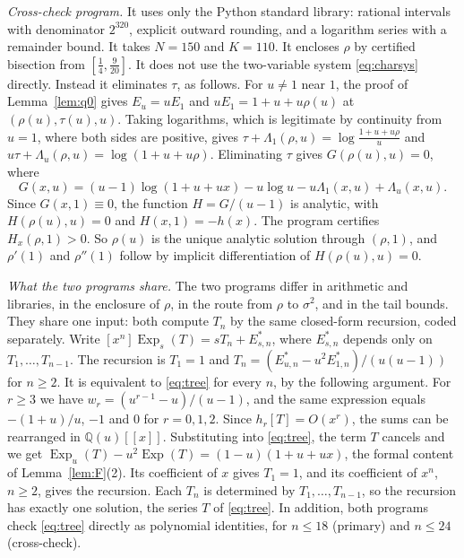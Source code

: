 \documentclass[11pt]{amsart}
\theoremstyle{definition}
\theoremstyle{remark}
\numberwithin{equation}{section}
\DeclareMathOperator{\Exp}{Exp}
\newcommand{\QQ}{\mathbb{Q}}
\begin{document}
\emph{Cross-check program.} It uses only the Python standard library: rational intervals with denominator \(2^{320}\), explicit outward rounding, and a logarithm series with a remainder bound. It takes \(N=150\) and \(K=110\). It encloses \(\rho\) by certified bisection from \([\frac14,\frac9{20}]\). It does not use the two-variable system \eqref{eq:charsys} directly. Instead it eliminates \(\tau\), as follows. For \(u\ne1\) near \(1\), the proof of Lemma~\ref{lem:q0} gives \(E_u=uE_1\) and \(uE_1=1+u+u\rho(u)\) at \((\rho(u),\tau(u),u)\). Taking logarithms, which is legitimate by continuity from \(u=1\), where both sides are positive, gives \(\tau+\Lambda_1(\rho,u)=\log\frac{1+u+u\rho}{u}\) and \(u\tau+\Lambda_u(\rho,u)=\log(1+u+u\rho)\). Eliminating \(\tau\) gives \(G(\rho(u),u)=0\), where
\begin{equation}\label{eq:scalar}
G(x,u)=(u-1)\log(1+u+ux)-u\log u-u\Lambda_1(x,u)+\Lambda_u(x,u).
\end{equation}
Since \(G(x,1)\equiv0\), the function \(H=G/(u-1)\) is analytic, with \(H(\rho(u),u)=0\) and \(H(x,1)=-h(x)\). The program certifies \(H_x(\rho,1)>0\). So \(\rho(u)\) is the unique analytic solution through \((\rho,1)\), and \(\rho'(1)\) and \(\rho''(1)\) follow by implicit differentiation of \(H(\rho(u),u)=0\).

\emph{What the two programs share.} The two programs differ in arithmetic and libraries, in the enclosure of \(\rho\), in the route from \(\rho\) to \(\sigma^2\), and in the tail bounds. They share one input: both compute \(T_n\) by the same closed-form recursion, coded separately. Write \([x^n]\Exp_s(T)=sT_n+E^\ast_{s,n}\), where \(E^\ast_{s,n}\) depends only on \(T_1,\dots,T_{n-1}\). The recursion is \(T_1=1\) and \(T_n=(E^\ast_{u,n}-u^2E^\ast_{1,n})/(u(u-1))\) for \(n\ge2\). It is equivalent to \eqref{eq:tree} for every \(n\), by the following argument. For \(r\ge3\) we have \(w_r=(u^{r-1}-u)/(u-1)\), and the same expression equals \(-(1+u)/u\), \(-1\) and \(0\) for \(r=0,1,2\). Since \(h_r[T]=O(x^r)\), the sums can be rearranged in \(\QQ(u)[[x]]\). Substituting into \eqref{eq:tree}, the term \(T\) cancels and we get \(\Exp_u(T)-u^2\Exp(T)=(1-u)(1+u+ux)\), the formal content of Lemma~\ref{lem:F}(2). Its coefficient of \(x\) gives \(T_1=1\), and its coefficient of \(x^n\), \(n\ge2\), gives the recursion. Each \(T_n\) is determined by \(T_1,\dots,T_{n-1}\), so the recursion has exactly one solution, the series \(T\) of \eqref{eq:tree}. In addition, both programs check \eqref{eq:tree} directly as polynomial identities, for \(n\le18\) (primary) and \(n\le24\) (cross-check).
\end{document}
